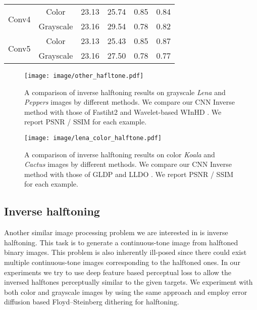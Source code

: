 \documentclass[journal]{IEEEtran}
\begin{document}
\begin{table}[]
\begin{tabular}{c|c|c|c|c|c}
\multirow{2}{*}{Conv4}                                   & Color                                      & 23.13          & 25.74    & 0.85           & 0.84     \\ \cline{2-6}
                                                         & Grayscale                                  & 23.16          & 29.54    & 0.78           & 0.82     \\ \hline
\multirow{2}{*}{Conv5}                                   & Color                                      & 23.13          & 25.43    & 0.85           & 0.87     \\ \cline{2-6}
                                                         & Grayscale                                  & 23.16          & 27.50    & 0.78           & 0.77     \\ \hline
\end{tabular}
\end{table}


\begin{figure*}[!htb]
\centering
  \texttt{[image: image/other\_hafltone.pdf]}
  \caption{A comparison of inverse halftoning results on grayscale \textit{Lena} and \textit{Peppers} images by different methods. We compare our CNN Inverse method with those of Fastiht2 \cite{kite2000fast} and Wavelet-based WInHD \cite{neelamani2002winhd}. We report PSNR / SSIM for each example.}
  \label{fig:other_hafltone}
\end{figure*}

\begin{figure*}[!htb]
\centering
  \texttt{[image: image/lena\_color\_halftone.pdf]}
  \caption{A comparison of inverse halftoning results on color \textit{Koala} and \textit{Cactus} images by different methods. We compare our CNN Inverse method with those of GLDP \cite{son2012inverse} and LLDO \cite{son2014local}. We report PSNR / SSIM for each example.}
  \label{fig:lena_color_halftone}
\end{figure*}




\subsection{Inverse halftoning}
Another similar image processing problem we are interested in is inverse halftoning. This task is to generate a continuous-tone image from halftoned binary images. This problem is also inherently ill-posed since there could exist multiple continuous-tone images corresponding to the halftoned ones. In our experiments we try to use deep feature based perceptual loss to allow the inversed halftones perceptually similar to the given targets. We experiment with both color and grayscale images by using the same approach and employ error diffusion based Floyd–Steinberg dithering for halftoning.
\end{document}
